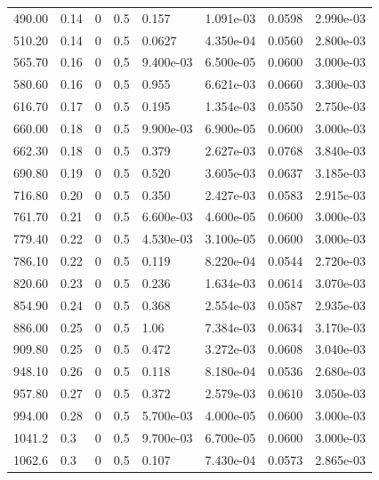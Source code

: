 \documentclass[preview]{standalone}
\begin{document}
{{\begin{tabular}{L{1.2cm}C{1.2cm} C{0.3cm}C{0.5cm} C{1.4cm}C{1.4cm} C{1.4cm}C{1.4cm}}
  490.00  &  0.14  & 0     & 0.5 &  0.157  & 1.091e-03  & 0.0598 &  2.990e-03   \\ 
  510.20  &  0.14  & 0     & 0.5 &  0.0627  & 4.350e-04  & 0.0560 &  2.800e-03   \\ 
  565.70  &  0.16  & 0     & 0.5 &  9.400e-03  & 6.500e-05  & 0.0600 &  3.000e-03   \\ 
  580.60  &  0.16  & 0     & 0.5 &  0.955  & 6.621e-03  & 0.0660 &  3.300e-03   \\ 
  616.70  &  0.17  & 0     & 0.5 &  0.195  & 1.354e-03  & 0.0550 &  2.750e-03   \\ 
  660.00  &  0.18  & 0     & 0.5 &  9.900e-03  & 6.900e-05  & 0.0600 &  3.000e-03   \\ 
  662.30  &  0.18  & 0     & 0.5 &  0.379  & 2.627e-03  & 0.0768 &  3.840e-03   \\ 
  690.80  &  0.19  & 0     & 0.5 &  0.520  & 3.605e-03  & 0.0637 &  3.185e-03   \\ 
  716.80  &  0.20  & 0     & 0.5 &  0.350  & 2.427e-03  & 0.0583 &  2.915e-03   \\ 
  761.70  &  0.21  & 0     & 0.5 &  6.600e-03  & 4.600e-05  & 0.0600 &  3.000e-03   \\ 
  779.40  &  0.22  & 0     & 0.5 &  4.530e-03  & 3.100e-05  & 0.0600 &  3.000e-03   \\ 
  786.10  &  0.22  & 0     & 0.5 &  0.119  & 8.220e-04  & 0.0544 &  2.720e-03   \\ 
  820.60  &  0.23  & 0     & 0.5 &  0.236  & 1.634e-03  & 0.0614 &  3.070e-03   \\ 
  854.90  &  0.24  & 0     & 0.5 &  0.368  & 2.554e-03  & 0.0587 &  2.935e-03   \\ 
  886.00  &  0.25  & 0     & 0.5 &  1.06  & 7.384e-03  & 0.0634 &  3.170e-03   \\ 
  909.80  &  0.25  & 0     & 0.5 &  0.472  & 3.272e-03  & 0.0608 &  3.040e-03   \\ 
  948.10  &  0.26  & 0     & 0.5 &  0.118  & 8.180e-04  & 0.0536 &  2.680e-03   \\ 
  957.80  &  0.27  & 0     & 0.5 &  0.372  & 2.579e-03  & 0.0610 &  3.050e-03   \\ 
  994.00  &  0.28  & 0     & 0.5 &  5.700e-03  & 4.000e-05  & 0.0600 &  3.000e-03   \\ 
  1041.2  &   0.3  & 0     & 0.5 &  9.700e-03  & 6.700e-05  & 0.0600 &  3.000e-03   \\ 
  1062.6  &   0.3  & 0     & 0.5 &  0.107  & 7.430e-04  & 0.0573 &  2.865e-03   \\ 

\end{tabular}}}
\end{document}
